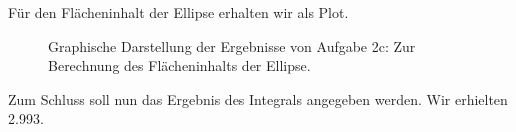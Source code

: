 Für den Flächeninhalt der Ellipse erhalten wir als Plot.
\begin{landscape}
	\begin{figure}
		\caption{Graphische Darstellung der Ergebnisse von Aufgabe 2c: Zur Berechnung des Flächeninhalts der Ellipse.}
		\label{fig:1b}
	\end{figure}
\end{landscape}

Zum Schluss soll nun das Ergebnis des Integrals angegeben werden. Wir erhielten 2.993.


